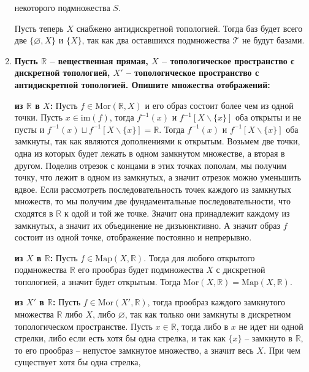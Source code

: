 \documentclass{article}
\begin{document}
\begin{enumerate}
        некоторого подмножества $S$.\par
        Пусть теперь $X$ снабжено антидискретной топологией. Тогда баз будет
        всего две $\{\varnothing, X\}$ и $\{X\}$, так как два оставшихся
        подмножества $\mathcal{T}$ не будут базами.
    \item \textbf{Пусть $\mathbb{R}$ – вещественная прямая, $X$ –
        топологическое пространство с дискретной топологией, $X'$ –
        топологическое пространство с антидискретной топологией. Опишите
        множества отображений:}\par
        \textbf{из $\mathbb{R}$ в $X$:} Пусть $f\in\text{Mor}(\mathbb{R}, X)$ и
        его образ состоит более чем из одной точки. Пусть $x\in\text{im}(f)$, 
        тогда $f^{-1}(x)$ и $f^{-1}[X\backslash\{x\}]$ оба открыты и не пусты и
        $f^{-1}(x)\sqcup f^{-1}[X\backslash\{x\}]=\mathbb{R}$. Тогда $f^{-1}(x)$
        и $f^{-1}[X\backslash\{x\}]$ оба замкнуты, так как являются дополнениями
        к открытым. Возьмем две точки, одна из которых будет лежать в одном
        замкнутом множестве, а вторая в другом. Поделив отрезок с концами в
        этих точках пополам, мы получим точку, что лежит в одном из замкнутых,
        а значит отрезок можно уменьшить вдвое. Если рассмотреть
        последовательность точек каждого из замкнутых множеств, то мы получим
        две фундаментальные последовательности, что сходятся в $\mathbb{R}$ к
        одой и той же точке. Значит она принадлежит каждому из замкнутых, а
        значит их объединение не дизъюнктивно. А значит образ $f$ состоит из
        одной точке, отображение постоянно и непрерывно.\par 
        \textbf{из $X$ в $\mathbb{R}$:} Пусть $f \in \text{Map}(X, \mathbb{R})$.
        Тогда для любого открытого подмножества $\mathbb{R}$ его прообраз будет
        подмножества $X$ с дискретной топологией, а значит будет открытым.
        Тогда $\text{Mor}(X, \mathbb{R})=\text{Map}(X, \mathbb{R})$.\par
        \textbf{из $X'$ в $\mathbb{R}$:} Пусть $f\in\text{Mor}(X',
        \mathbb{R})$, тогда прообраз каждого замкнутого множества $\mathbb{R}$
        либо $X$, либо $\varnothing$, так как только они замкнуты в дискретном
        топологическом пространстве. Пусть $x\in\mathbb{R}$, тогда либо в $x$
        не идет ни одной стрелки, либо если есть хотя бы одна стрелка, и так как
        $\{x\}$ – замкнуто в $\mathbb{R}$, то его прообраз – непустое замкнутое
        множество, а значит весь $X$. При чем существует хотя бы одна стрелка,

\end{enumerate}
\end{document}
